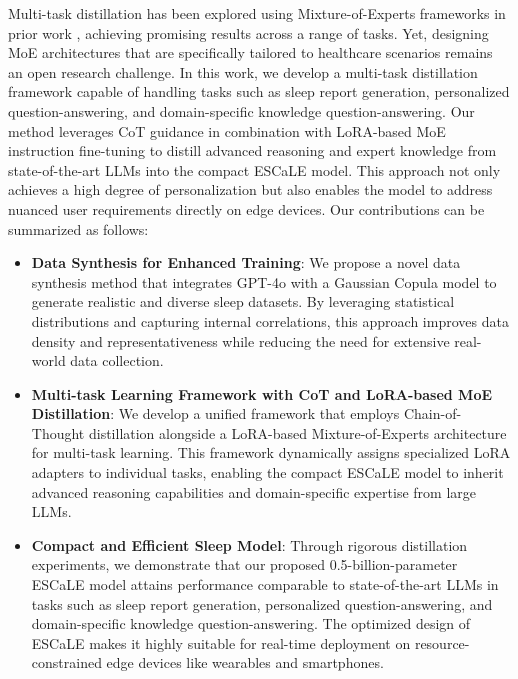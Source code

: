 \documentclass[preprint,12pt]{elsarticle}
\begin{document}
Multi-task distillation has been explored using Mixture-of-Experts frameworks in prior work \cite{liu2023moeLoRA, gao2024higher, yang2024moral}, achieving promising results across a range of tasks. Yet, designing MoE architectures that are specifically tailored to healthcare scenarios remains an open research challenge. In this work, we develop a multi-task distillation framework capable of handling tasks such as sleep report generation, personalized question-answering, and domain-specific knowledge question-answering. Our method leverages CoT guidance in combination with LoRA-based MoE instruction fine-tuning to distill advanced reasoning and expert knowledge from state-of-the-art LLMs into the compact ESCaLE model. This approach not only achieves a high degree of personalization but also enables the model to address nuanced user requirements directly on edge devices.
Our contributions can be summarized as follows:
\begin{itemize}
  \item \textbf{Data Synthesis for Enhanced Training}: We propose a novel data synthesis method that integrates GPT-4o with a Gaussian Copula model to generate realistic and diverse sleep datasets. By leveraging statistical distributions and capturing internal correlations, this approach improves data density and representativeness while reducing the need for extensive real-world data collection.
  \item \textbf{Multi-task Learning Framework with CoT and LoRA-based MoE Distillation}: We develop a unified framework that employs Chain-of-Thought distillation alongside a LoRA-based Mixture-of-Experts architecture for multi-task learning. This framework dynamically assigns specialized LoRA adapters to individual tasks, enabling the compact ESCaLE model to inherit advanced reasoning capabilities and domain-specific expertise from large LLMs.
  \item \textbf{Compact and Efficient Sleep Model}: Through rigorous distillation experiments, we demonstrate that our proposed 0.5-billion-parameter ESCaLE model attains performance comparable to state-of-the-art LLMs in tasks such as sleep report generation, personalized question-answering, and domain-specific knowledge question-answering. The optimized design of ESCaLE makes it highly suitable for real-time deployment on resource-constrained edge devices like wearables and smartphones.
\end{itemize}
\end{document}
